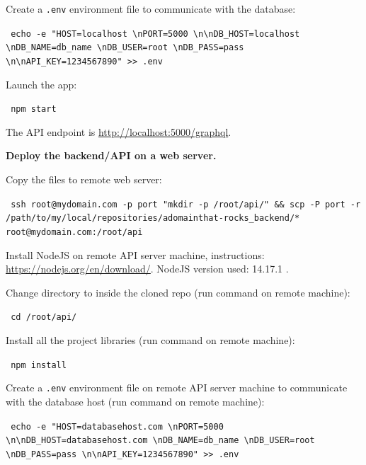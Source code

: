 \noindent Create a \texttt{.env} environment file to communicate with the database:

\noindent\colorbox{lightestgray}{
	\parbox{1\linewidth-9pt}{%
		\texttt{\tiny\faDollarSign\large\ echo -e "HOST=localhost \textbackslash nPORT=5000 \textbackslash n\textbackslash nDB\_HOST=localhost \textbackslash nDB\_NAME=db\_name \textbackslash nDB\_USER=root \textbackslash nDB\_PASS=pass \textbackslash n\textbackslash nAPI\_KEY=1234567890" >{}> .env}
	}%
}%

\medskip

\noindent Launch the app:

\noindent\colorbox{lightestgray}{
	\parbox{1\linewidth-9pt}{%
		\texttt{\tiny\faDollarSign\large\ npm start}
	}%
}%

\medskip

\noindent The \acrshort{API} endpoint is \url{http://localhost:5000/graphql}.
\bigskip

\noindent \textbf{Deploy the backend/\acrshort{API} on a web server.}

\noindent Copy the files to remote web server:

\noindent\colorbox{lightestgray}{
	\parbox{1\linewidth-9pt}{%
		\texttt{\tiny\faDollarSign\large\ ssh root@mydomain.com -p port "mkdir -p /root/api/" \&\& scp -P port -r /path/to/my/local/repositories/adomainthat-rocks\_backend/* root@mydomain.com:/root/api}
	}%
}%

\medskip

\noindent Install NodeJS on remote \acrshort{API} server machine, instructions: \url{https://nodejs.org/en/download/}. NodeJS version used: 14.17.1 .

\noindent Change directory to inside the cloned repo (run command on remote machine):

\noindent\colorbox{lightestgray}{
	\parbox{1\linewidth-9pt}{%
		\texttt{\tiny\faHashtag\large\ cd /root/api/}
	}%
}%

\medskip

\noindent Install all the project libraries (run command on remote machine):

\noindent\colorbox{lightestgray}{
	\parbox{1\linewidth-9pt}{%
		\texttt{\tiny\faHashtag\large\ npm install}
	}%
}%

\medskip

\noindent Create a \texttt{.env} environment file on remote \acrshort{API} server machine to communicate with the database host (run command on remote machine):

\noindent\colorbox{lightestgray}{
	\parbox{1\linewidth-9pt}{%
		\texttt{\tiny\faHashtag\large\ echo -e "HOST=databasehost.com \textbackslash nPORT=5000 \textbackslash n\textbackslash nDB\_HOST=databasehost.com \textbackslash nDB\_NAME=db\_name \textbackslash nDB\_USER=root \textbackslash nDB\_PASS=pass \textbackslash n\textbackslash nAPI\_KEY=1234567890" >{}> .env}
	}%
}%

